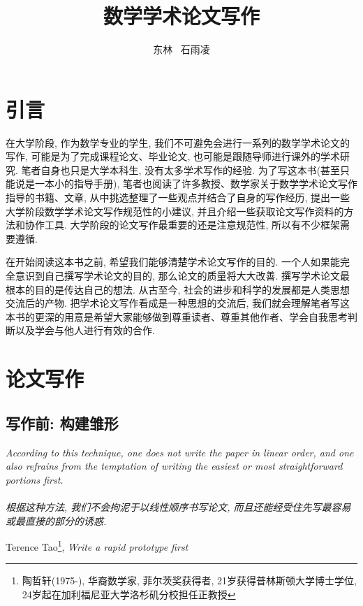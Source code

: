 \documentclass{formatBook}
\begin{document}
\title{数学学术论文写作}
\author{东林 \ 石雨凌}
\maketitle
\tableofcontents
\setlength{\parskip}{1.5em}
\newpage
\chapter{引言}
在大学阶段, 作为数学专业的学生, 我们不可避免会进行一系列的数学学术论文的写作, 可能是为了完成课程论文、毕业论文, 也可能是跟随导师进行课外的学术研究. 笔者自身也只是大学本科生, 没有太多学术写作的经验. 为了写这本书(甚至只能说是一本小的指导手册), 笔者也阅读了许多教授、数学家关于数学学术论文写作指导的书籍、文章, 从中挑选整理了一些观点并结合了自身的写作经历, 提出一些大学阶段数学学术论文写作规范性的小建议, 并且介绍一些获取论文写作资料的方法和协作工具. 大学阶段的论文写作最重要的还是注意规范性, 所以有不少框架需要遵循.


\par 在开始阅读这本书之前, 希望我们能够清楚学术论文写作的目的. 一个人如果能完全意识到自己撰写学术论文的目的, 那么论文的质量将大大改善. 撰写学术论文最根本的目的是传达自己的想法. 从古至今, 社会的进步和科学的发展都是人类思想交流后的产物. 把学术论文写作看成是一种思想的交流后, 我们就会理解笔者写这本书的更深的用意是希望大家能够做到尊重读者、尊重其他作者、学会自我思考判断以及学会与他人进行有效的合作. 

\chapter{论文写作}
\section{写作前: 构建雏形}
\setlength{\parskip}{1em}
\noindent \textit{According to this technique, one does not write the paper in linear order, and one also refrains from the temptation of writing the easiest or most straightforward portions first. \\ \ \\ 根据这种方法, 我们不会拘泥于以线性顺序书写论文, 而且还能经受住先写最容易或最直接的部分的诱惑. }
\begin{flushright}
    \cndash Terence Tao\footnote{陶哲轩(1975-), 华裔数学家, 菲尔茨奖获得者, 21岁获得普林斯顿大学博士学位,  24岁起在加利福尼亚大学洛杉矶分校担任正教授}, \textit{Write a rapid prototype first\cite{TaoWrite2007}}
\end{flushright}
\setlength{\parskip}{1.5em}
\end{document}
